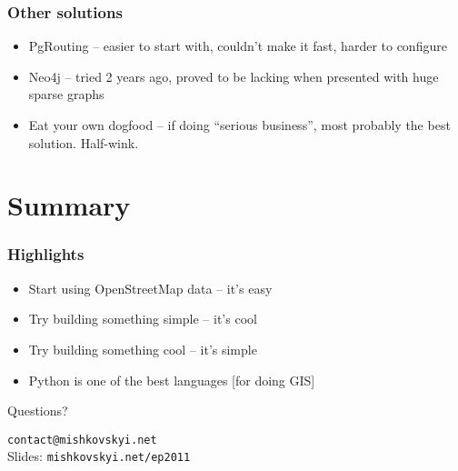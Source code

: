 \documentclass[14pt]{beamer}
\begin{document}
\begin{frame}
  \frametitle{Other solutions}
  \begin{itemize}
  \item PgRouting -- easier to start with, couldn't make it fast,
    harder to configure
  \item Neo4j -- tried 2 years ago, proved to be lacking when
    presented with huge sparse graphs
  \item Eat your own dogfood -- if doing ``serious business'', most
    probably the best solution. Half-wink.
  \end{itemize}
\end{frame}

\section*{Summary}

\begin{frame}
  \begin{center}
  \end{center}
\end{frame}

\begin{frame}
  \frametitle{Highlights}
  \begin{itemize}
  \item Start using OpenStreetMap data -- it's easy
  \item Try building something simple -- it's cool
  \item Try building something cool -- it's simple
  \item Python is one of the best languages [for doing GIS]
  \end{itemize}
\end{frame}

\begin{frame}
  \begin{center}
    \LARGE{Questions?}
  \end{center}
  \vfill
  \begin{center}
    \texttt{contact@mishkovskyi.net}\\
    Slides: \texttt{mishkovskyi.net/ep2011}
  \end{center}
\end{frame}



\end{document}
